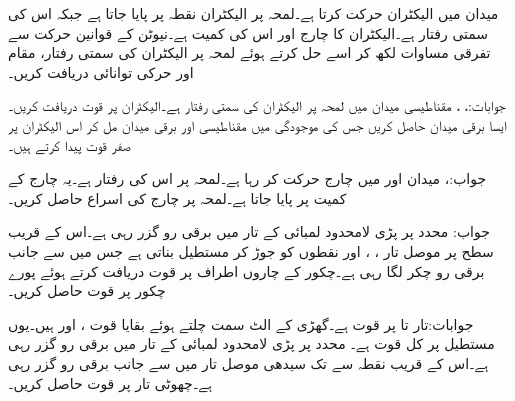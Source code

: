 میدان  میں الیکٹران  حرکت کرتا ہے۔لمحہ  پر الیکٹران نقطہ  پر پایا جاتا ہے جبکہ اس کی سمتی رفتار  ہے۔الیکٹران کا چارج  اور اس کی کمیت  ہے۔نیوٹن کے قوانین حرکت سے تفرقی مساوات لکھ کر اسے حل کرتے ہوئے لمحہ  پر الیکٹران کی سمتی رفتار، مقام اور حرکی توانائی دریافت کریں۔

جوابات:، ، 
مقناطیسی میدان  میں لمحہ  پر الیکٹران کی سمتی رفتار  ہے۔الیکٹران پر قوت دریافت کریں۔ایسا برقی میدان حاصل کریں جس کی موجودگی میں مقناطیسی اور برقی میدان مل کر اس الیکٹران پر صفر قوت  پیدا کرتے ہیں۔

جواب:، 
میدان  اور  میں چارج  حرکت کر رہا ہے۔لمحہ  پر اس کی رفتار  ہے۔یہ چارج  کے کمیت پر پایا جاتا ہے۔لمحہ  پر چارج کی اسراع حاصل کریں۔

جواب:
محدد  پر پڑی لامحدود لمبائی کے تار میں  برقی رو گزر رہی ہے۔اس کے قریب سطح  پر موصل تار ، ،  اور  نقطوں کو جوڑ کر مستطیل بناتی ہے جس میں  سے  جانب  برقی رو چکر  لگا رہی ہے۔چکور کے چاروں اطراف پر قوت دریافت کرتے ہوئے پورے چکور پر قوت حاصل کریں۔

جوابات:تار  تا  پر قوت  ہے۔گھڑی کے الٹ سمت چلتے ہوئے بقایا قوت  ،  اور  ہیں۔یوں مستطیل پر کل قوت  ہے۔
محدد  پر پڑی لامحدود لمبائی کے تار میں  برقی رو گزر رہی ہے۔اس کے قریب نقطہ  سے  تک سیدھی موصل تار میں  سے  جانب  برقی رو گزر رہی ہے۔چھوٹی تار پر قوت حاصل کریں۔

